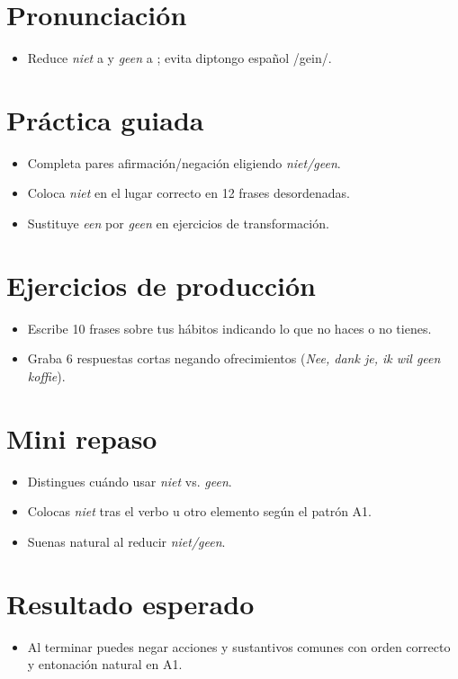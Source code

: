 \section{Pronunciación}
\begin{itemize}[leftmargin=*]
	\item Reduce \textit{niet} a  y \textit{geen} a ; evita diptongo español /gein/.
\end{itemize}

\section{Práctica guiada}
\begin{itemize}[leftmargin=*]
	\item Completa pares afirmación/negación eligiendo \textit{niet/geen}.
	\item Coloca \textit{niet} en el lugar correcto en 12 frases desordenadas.
	\item Sustituye \textit{een} por \textit{geen} en ejercicios de transformación.
\end{itemize}

\section{Ejercicios de producción}
\begin{itemize}[leftmargin=*]
	\item Escribe 10 frases sobre tus hábitos indicando lo que no haces o no tienes.
	\item Graba 6 respuestas cortas negando ofrecimientos (\textit{Nee, dank je, ik wil geen koffie}).
\end{itemize}

\section{Mini repaso}
\begin{itemize}[leftmargin=*]
	\item Distingues cuándo usar \textit{niet} vs. \textit{geen}.
	\item Colocas \textit{niet} tras el verbo u otro elemento según el patrón A1.
	\item Suenas natural al reducir \textit{niet/geen}.
\end{itemize}

\section{Resultado esperado}
\begin{itemize}[leftmargin=*]
	\item Al terminar puedes negar acciones y sustantivos comunes con orden correcto y entonación natural en A1.
\end{itemize}

